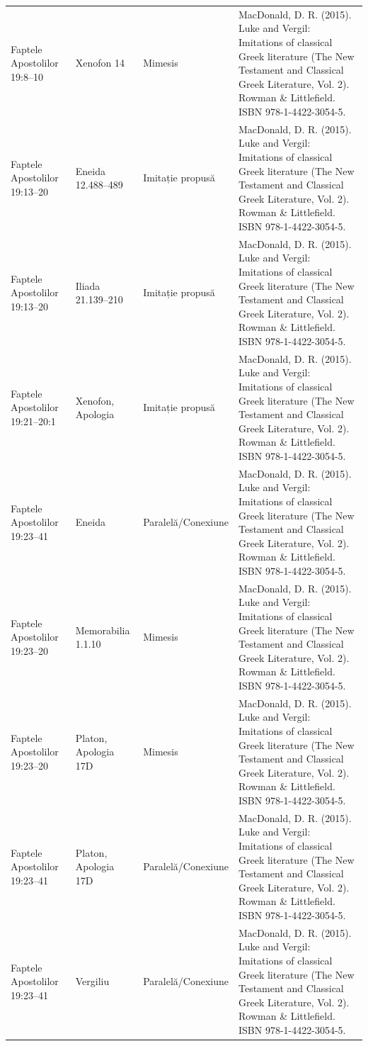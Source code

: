 \documentclass[12pt,a4paper,twoside,openany]{book}
\begin{document}
\begin{longtable}{L{1.4cm}L{1.7cm}L{3.1cm}L{8.4cm}}
Faptele Apostolilor 19:8–10 & Xenofon 14 & Mimesis & MacDonald, D. R. (2015). Luke and Vergil: Imitations of classical Greek literature (The New Testament and Classical Greek Literature, Vol. 2). Rowman \& Littlefield. ISBN 978-1-4422-3054-5. \\
Faptele Apostolilor 19:13–20 & Eneida 12.488–489 & Imitație propusă & MacDonald, D. R. (2015). Luke and Vergil: Imitations of classical Greek literature (The New Testament and Classical Greek Literature, Vol. 2). Rowman \& Littlefield. ISBN 978-1-4422-3054-5. \\
Faptele Apostolilor 19:13–20 & Iliada 21.139–210 & Imitație propusă & MacDonald, D. R. (2015). Luke and Vergil: Imitations of classical Greek literature (The New Testament and Classical Greek Literature, Vol. 2). Rowman \& Littlefield. ISBN 978-1-4422-3054-5. \\
Faptele Apostolilor 19:21–20:1 & Xenofon, Apologia & Imitație propusă & MacDonald, D. R. (2015). Luke and Vergil: Imitations of classical Greek literature (The New Testament and Classical Greek Literature, Vol. 2). Rowman \& Littlefield. ISBN 978-1-4422-3054-5. \\
Faptele Apostolilor 19:23–41 & Eneida & Paralelă/Conexiune & MacDonald, D. R. (2015). Luke and Vergil: Imitations of classical Greek literature (The New Testament and Classical Greek Literature, Vol. 2). Rowman \& Littlefield. ISBN 978-1-4422-3054-5. \\
Faptele Apostolilor 19:23–20 & Memorabilia 1.1.10 & Mimesis & MacDonald, D. R. (2015). Luke and Vergil: Imitations of classical Greek literature (The New Testament and Classical Greek Literature, Vol. 2). Rowman \& Littlefield. ISBN 978-1-4422-3054-5. \\
Faptele Apostolilor 19:23–20 & Platon, Apologia 17D & Mimesis & MacDonald, D. R. (2015). Luke and Vergil: Imitations of classical Greek literature (The New Testament and Classical Greek Literature, Vol. 2). Rowman \& Littlefield. ISBN 978-1-4422-3054-5. \\
Faptele Apostolilor 19:23–41 & Platon, Apologia 17D & Paralelă/Conexiune & MacDonald, D. R. (2015). Luke and Vergil: Imitations of classical Greek literature (The New Testament and Classical Greek Literature, Vol. 2). Rowman \& Littlefield. ISBN 978-1-4422-3054-5. \\
Faptele Apostolilor 19:23–41 & Vergiliu & Paralelă/Conexiune & MacDonald, D. R. (2015). Luke and Vergil: Imitations of classical Greek literature (The New Testament and Classical Greek Literature, Vol. 2). Rowman \& Littlefield. ISBN 978-1-4422-3054-5. \\

\end{longtable}
\end{document}

